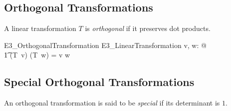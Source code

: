 \documentclass{amsart}
\begin{document}
\subsection{Orthogonal Transformations}

A linear transformation $T$ is \textit{orthogonal} if it preserves dot products.

\begin{schema}{E3\_OrthogonalTransformation}
	E3\_LinearTransformation
\where
	\forall v, w: \Ethree @ \\
	\t1	(T~v) \dotEthree (T~w) = v \dotEthree w
\end{schema}

\subsection{Special Orthogonal Transformations}

An orthogonal transformation is said to be \textit{special} if its determinant is $1$.
\end{document}
